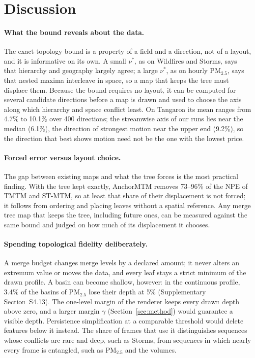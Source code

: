 \section{Discussion}\label{sec:discussion}
\paragraph{What the bound reveals about the data.} The exact-topology bound is a property of a field and a direction, not of a layout, and it is informative on its own. A small $\nu^*$, as on Wildfires and Storms, says that hierarchy and geography largely agree; a large $\nu^*$, as on hourly PM$_{2.5}$, says that nested maxima interleave in space, so a map that keeps the tree must displace them. Because the bound requires no layout, it can be computed for several candidate directions before a map is drawn and used to choose the axis along which hierarchy and space conflict least. On Tangaroa its mean ranges from 4.7\% to 10.1\% over 400 directions; the streamwise axis of our runs lies near the median (6.1\%), the direction of strongest motion near the upper end (9.2\%), so the direction that best shows motion need not be the one with the lowest price.

\paragraph{Forced error versus layout choice.} The gap between existing maps and what the tree forces is the most practical finding. With the tree kept exactly, AnchorMTM removes 73--96\% of the NPE of TMTM and ST-MTM, so at least that share of their displacement is not forced; it follows from ordering and placing leaves without a spatial reference. Any merge tree map that keeps the tree, including future ones, can be measured against the same bound and judged on how much of its displacement it chooses.

\paragraph{Spending topological fidelity deliberately.} A merge budget changes merge levels by a declared amount; it never alters an extremum value or moves the data, and every leaf stays a strict minimum of the drawn profile. A basin can become shallow, however: in the continuous profile, 3.4\% of the basins of PM$_{2.5}$ lose their depth at 5\% (Supplementary Section~S4.13). The one-level margin of the renderer keeps every drawn depth above zero, and a larger margin $\gamma$ (Section~\ref{sec:method}) would guarantee a visible depth. Persistence simplification at a comparable threshold would delete features below it instead. The share of frames that use it distinguishes sequences whose conflicts are rare and deep, such as Storms, from sequences in which nearly every frame is entangled, such as PM$_{2.5}$ and the volumes.


